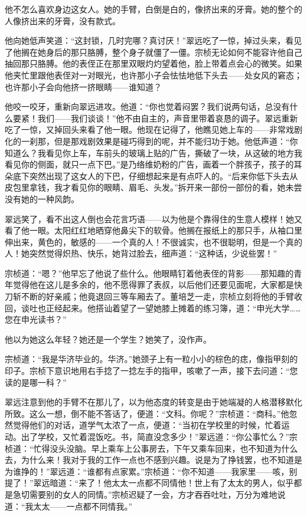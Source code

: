 \par 他不怎么喜欢身边这女人。她的手臂，白倒是白的，像挤出来的牙膏。她的整个的人像挤出来的牙膏，没有款式。
\par 他向她低声笑道：“这封锁，几时完哪？真讨厌！”翠远吃了一惊，掉过头来，看见了他搁在她身后的那只胳膊，整个身子就僵了一僵。宗桢无论如何不能容许他自己抽回那只胳膊。他的表侄正在那里双眼灼灼望着他，脸上带着点会心的微笑。如果他夹忙里跟他表侄对一对眼光，也许那小子会怯怯地低下头去——处女风的窘态；也许那小子会向他挤一挤眼睛——谁知道？
\par 他咬一咬牙，重新向翠远进攻。他道：“你也觉着闷罢？我们说两句话，总没有什么要紧！我们——我们谈谈！”他不由自主的，声音里带着哀恳的调子。翠远重新吃了一惊，又掉回头来看了他一眼。他现在记得了，他瞧见她上车的——非常戏剧化的一刹那，但是那戏剧效果是碰巧得到的呢，并不能归功于她。他低声道：“你知道么？我看见你上车，车前头的玻璃上贴的广告，撕破了一块，从这破的地方我看见你的侧面，就只一点下巴。”是乃络维奶粉的广告，画着一个胖孩子，孩子的耳朵底下突然出现了这女人的下巴，仔细想起来是有点吓人的。“后来你低下头去从皮包里拿钱，我才看见你的眼睛、眉毛、头发。”拆开来一部份一部份的看，她未尝没有她的一种风韵。
\par 翠远笑了，看不出这人倒也会花言巧语——以为他是个靠得住的生意人模样！她又看了他一眼。太阳红红地晒穿他鼻尖下的软骨。他搁在报纸上的那只手，从袖口里伸出来，黄色的，敏感的——一个真的人！不很诚实，也不很聪明，但是一个真的人！她突然觉得炽热、快乐，她背过脸去，细声道：“这种话，少说些罢！”
\par 宗桢道：“嗯？”他早忘了他说了些什么。他眼睛钉着他表侄的背影——那知趣的青年觉得他在这儿是多余的，他不愿得罪了表叔，以后他们还要见面呢，大家都是快刀斩不断的好亲戚；他竟退回三等车厢去了。董培芝一走，宗桢立刻将他的手臂收回，谈吐也正经起来。他搭讪着望了一望她膝上摊着的练习簿，道：“申光大学……您在申光读书？”
\par 他以为她这么年轻？她还是一个学生？她笑了，没作声。
\par 宗桢道：“我是华济毕业的。华济。”她颈子上有一粒小小的棕色的痣，像指甲刻的印子。宗桢下意识地用右手捻了一捻左手的指甲，咳嗽了一声，接下去问道：“您读的是哪一科？”
\par 翠远注意到他的手臂不在那儿了，以为他态度的转变是由于她端凝的人格潜移默化所致。这么一想，倒不能不答话了，便道：“文科。你呢？”宗桢道：“商科。”他忽然觉得他们的对话，道学气太浓了一点，便道：“当初在学校里的时候，忙着运动。出了学校，又忙着混饭吃。书，简直没念多少！”翠远道：“你公事忙么？”宗桢道：“忙得没头没脑。早上乘车上公事房去，下午又乘车回来，也不知道为什么去，为什么来！我对于我的工作一点也不感到兴趣。说是为了挣钱罢，也不知道是为谁挣的！”翠远道：“谁都有点家累。”宗桢道：“你不知道——我家里——咳，别提了！”翠远暗道：“来了！他太太一点都不同情他！世上有了太太的男人，似乎都是急切需要别的女人的同情。”宗桢迟疑了一会，方才吞吞吐吐，万分为难地说道：“我太太——一点都不同情我。”
